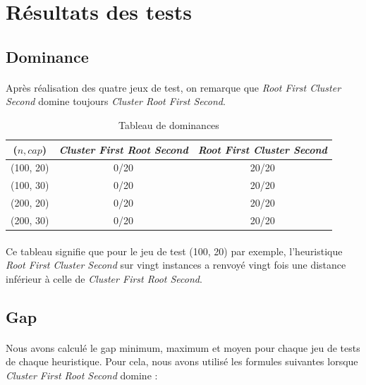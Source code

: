 \documentclass[twoside,UTF8]{EPURapport}
\begin{document}
\section{Résultats des tests}

\subsection{Dominance}

\paragraph{}
Après réalisation des quatre jeux de test, on remarque que  
\textit{Root First Cluster Second} domine toujours \textit{Cluster Root First Second}. 

\begin{table}[H]
\centering
\begin{tabular}{|c|c|c|}
\hline 
($n,cap$) & \textit{Cluster First Root Second} & \textit{Root First Cluster Second} \\ 
\hline 
(100, 20) & 0/20 & 20/20 \\ 
\hline 
(100, 30) & 0/20 & 20/20 \\
\hline 
(200, 20) & 0/20 & 20/20 \\ 
\hline 
(200, 30) & 0/20 & 20/20 \\ 
\hline 
\end{tabular}
\caption{Tableau de dominances} 
\end{table}

\paragraph{}
Ce tableau signifie que pour le jeu de test (100, 20) par exemple, l'heuristique \textit{Root First Cluster Second} sur vingt instances a renvoyé vingt fois une distance inférieur à celle de \textit{Cluster First Root Second}. 

\subsection{Gap}

\paragraph{}
Nous avons calculé le gap minimum, maximum et moyen pour chaque jeu de tests de chaque heuristique. 
Pour cela, nous avons utilisé les formules suivantes lorsque \textit{Cluster First Root Second} domine :  
\end{document}

